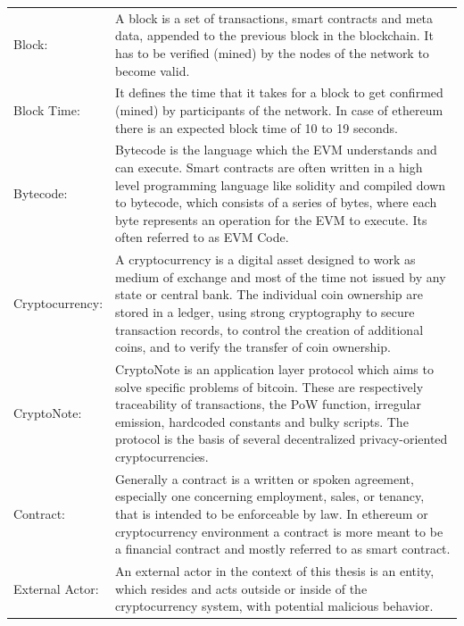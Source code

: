 
\clearpage

\begin{center}
	\begin{tabular}{ p{4cm} p{8cm} }
		Block: & A block is a set of transactions, smart contracts and meta data, appended to the previous block in the blockchain. It has to be verified (mined) by the nodes of the network to become valid. \\
		Block Time: & It defines the time that it takes for a block to get confirmed (mined) by participants of the network. In case of ethereum there is an expected block time of 10 to 19 seconds. \\
		Bytecode: & Bytecode is the language which the \ac{EVM} understands and can execute. Smart contracts are often written in a high level programming language like solidity and compiled down to bytecode, which consists of a series of bytes, where each byte represents an operation for the \ac{EVM} to execute. Its often referred to as \ac{EVM Code}. \\
		Cryptocurrency: & A cryptocurrency is a digital asset designed to work as medium of exchange and most of the time not issued by any state or central bank. The individual coin ownership are stored in a ledger, using strong cryptography to secure transaction records, to control the creation of additional coins, and to verify the transfer of coin ownership. \\
		CryptoNote: & CryptoNote is an application layer protocol which aims to solve specific problems of bitcoin. These are respectively traceability of transactions, the \ac{PoW} function, irregular emission, hardcoded constants and bulky scripts. The protocol is the basis of several decentralized privacy-oriented cryptocurrencies. \\
		Contract:  & Generally a contract is a written or spoken agreement, especially one concerning employment, sales, or tenancy, that is intended to be enforceable by law. In ethereum or cryptocurrency environment a contract is more meant to be a financial contract and mostly referred to as smart contract. \\
		External Actor: & An external actor in the context of this thesis is an entity, which resides and acts outside or inside of the cryptocurrency system, with potential malicious behavior. \\
	\end{tabular}
\end{center}

